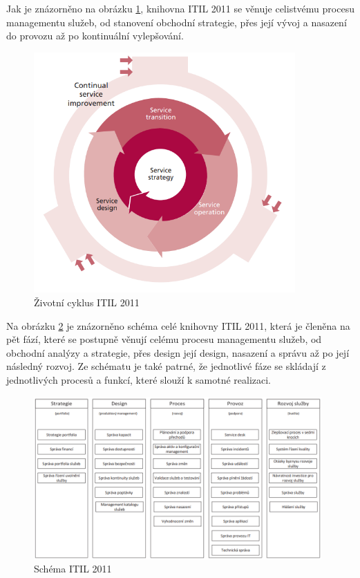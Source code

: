 \documentclass[
  digital,     %
  twoside,     %
  lof,         %
  lot,         %
]{fithesis4}
\begin{document}
Jak je znázorněno na obrázku \ref{fig:itil3_lifecycle}, knihovna ITIL 2011 se věnuje celistvému procesu managementu služeb, od stanovení obchodní strategie, přes její vývoj a nasazení do provozu až po kontinuální vylepšování. 
  
\begin{figure}[h]
  \begin{center}
          \includegraphics[width=10cm]{img/itil_V3_proces.png}
  \end{center}
  \caption{Životní cyklus ITIL 2011 \parencite[s.~7]{Carlidge2007}}
  \label{fig:itil3_lifecycle}
\end{figure}  

Na obrázku \ref{fig:itil3_schema} je znázorněno schéma celé knihovny ITIL 2011, která je členěna na pět fází, které se postupně věnují celému procesu managementu služeb, od obchodní analýzy a strategie, přes design její design, nasazení a správu až po její následný rozvoj. Ze schématu je také patrné, že jednotlivé fáze se skládají z jednotlivých procesů a funkcí, které slouží k samotné realizaci.

\begin{figure}[h]
  \begin{center}
          \includegraphics[width=11cm]{img/itil_V3_schema.png}
  \end{center}
  \caption{Schéma ITIL 2011 \parencite[s.~32]{Matula2017}}
  \label{fig:itil3_schema}
\end{figure} 
\end{document}
